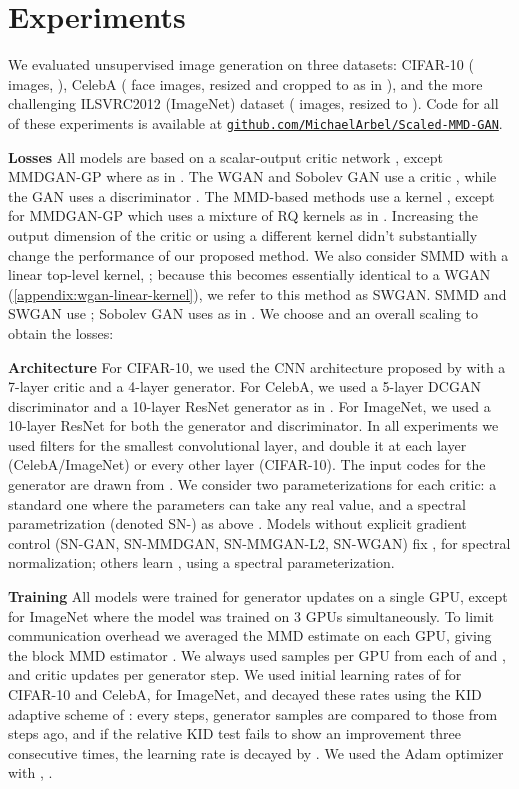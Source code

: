 \documentclass{article}
\newcommand{\httpsurl}[1]{\href{https://#1}{\nolinkurl{#1}}}
\begin{document}
\section{Experiments} \label{sec:experiments}

We evaluated unsupervised image generation on three datasets:
CIFAR-10 \parencite{cifar10} ( images, ),
CelebA \parencite{celeba} ( face images, resized and cropped to  as in \cite{Binkowski:2018}),
and the more challenging ILSVRC2012 (ImageNet) dataset \parencite{Russakovsky:2014} ( images, resized to ).
Code for all of these experiments is available at
\httpsurl{github.com/MichaelArbel/Scaled-MMD-GAN}.

\textbf{Losses} All models are based on a scalar-output critic network ,
except MMDGAN-GP where  as in \cite{Binkowski:2018}.
The WGAN and Sobolev GAN use a critic ,
while the GAN uses a discriminator .
The MMD-based methods use a kernel ,
except for MMDGAN-GP which uses a mixture of RQ kernels as in \cite{Binkowski:2018}.
Increasing the output dimension of the critic or using a different kernel didn't substantially change the performance of our proposed method.
We also consider SMMD with a linear top-level kernel, ;
because this becomes essentially identical to a WGAN (\cref{appendix:wgan-linear-kernel}),
we refer to this method as SWGAN.
SMMD and SWGAN use ; Sobolev GAN uses  as in \cite{sobolev-gan}.
We choose  and an overall scaling to obtain the losses:




\textbf{Architecture} For CIFAR-10, we used the CNN architecture proposed by \cite{Miyato:2018}
with a 7-layer critic and a 4-layer generator.
For CelebA, we used a 5-layer DCGAN discriminator and a 10-layer ResNet generator as in \parencite{Binkowski:2018}.
For ImageNet, we used a 10-layer ResNet for both the generator and discriminator.
In all experiments we used  filters for the smallest convolutional layer,
and double it at each layer (CelebA/ImageNet) or every other layer (CIFAR-10).
The input codes for the generator are drawn from .
We consider two parameterizations for each critic:
a standard one where the parameters can take any real value,
and a spectral parametrization (denoted SN-)
as above \parencite{Miyato:2018}.
Models without explicit gradient control
(SN-GAN, SN-MMDGAN, SN-MMGAN-L2, SN-WGAN)
fix , for spectral normalization;
others learn , using a spectral parameterization.

\textbf{Training}
All models were trained for  generator updates on a single GPU,
except for ImageNet where the model was trained on 3 GPUs simultaneously.
To limit communication overhead we averaged the MMD estimate on each GPU,
giving the block MMD estimator \parencite{b-test}.
We always used  samples per GPU from each of  and ,
and  critic updates per generator step.
We used initial learning rates of  for CIFAR-10 and CelebA,
 for ImageNet,
and decayed these rates using the KID adaptive scheme of \cite{Binkowski:2018}:
every  steps, generator samples are compared to those from  steps ago,
and if the relative KID test \parencite{3sample} fails to show an improvement three consecutive times,
the learning rate is decayed by .
We used the Adam optimizer \parencite{adam} with , .
\end{document}
